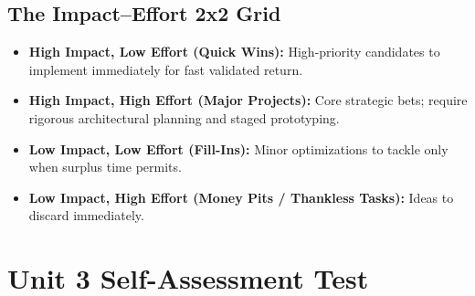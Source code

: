 \subsection{The Impact--Effort 2x2 Grid}
\begin{itemize}[leftmargin=1.2em, itemsep=3pt]
    \item \textbf{High Impact, Low Effort (Quick Wins):} High-priority candidates to implement immediately for fast validated return.
    \item \textbf{High Impact, High Effort (Major Projects):} Core strategic bets; require rigorous architectural planning and staged prototyping.
    \item \textbf{Low Impact, Low Effort (Fill-Ins):} Minor optimizations to tackle only when surplus time permits.
    \item \textbf{Low Impact, High Effort (Money Pits / Thankless Tasks):} Ideas to discard immediately.
\end{itemize}

\section{Unit 3 Self-Assessment Test}

